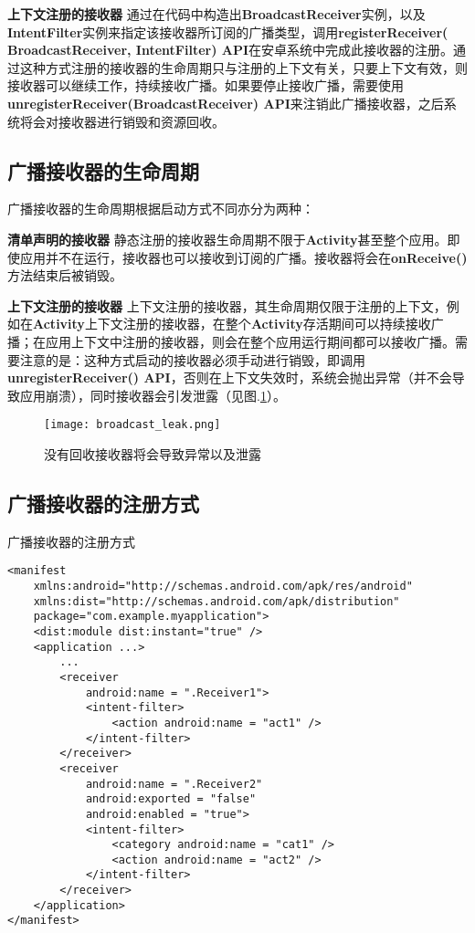 \textbf{上下文注册的接收器 }\label{declaration:receiver in context} 通过在代码中构造出\textbf{BroadcastReceiver}实例，以及\textbf{IntentFilter}实例来指定该接收器所订阅的广播类型，调用\textbf{registerReceiver(\\BroadcastReceiver, IntentFilter) API}在安卓系统中完成此接收器的注册。通过这种方式注册的接收器的生命周期只与注册的上下文有关，只要上下文有效，则接收器可以继续工作，持续接收广播。如果要停止接收广播，需要使用\textbf{unregisterReceiver(BroadcastReceiver) API}来注销此广播接收器，之后系统将会对接收器进行销毁和资源回收。

\subsection{广播接收器的生命周期}

广播接收器的生命周期根据启动方式不同亦分为两种\cite{broadcast}：

\textbf{清单声明的接收器 } 静态注册的接收器生命周期不限于\textbf{Activity}甚至整个应用。即使应用并不在运行，接收器也可以接收到订阅的广播。接收器将会在\textbf{onReceive()}方法结束后被销毁。


\textbf{上下文注册的接收器 } 上下文注册的接收器，其生命周期仅限于注册的上下文，例如在\textbf{Activity}上下文注册的接收器，在整个\textbf{Activity}存活期间可以持续接收广播；在应用上下文中注册的接收器，则会在整个应用运行期间都可以接收广播。需要注意的是：这种方式启动的接收器必须手动进行销毁，即调用\textbf{unregisterReceiver() API}，否则在上下文失效时，系统会抛出异常（并不会导致应用崩溃），同时接收器会引发泄露（见图.\textcolor{red}{\ref{fig:broadcast_leak}}）。

\begin{figure}[htbp]
	\centering
	\texttt{[image: broadcast\_leak.png]} %
	\caption{没有回收接收器将会导致异常以及泄露}
	\label{fig:broadcast_leak}
\end{figure}

\subsection{广播接收器的注册方式}
\begin{listing}[htbp]
	\centering
	\caption{广播接收器的注册方式}
	\begin{verbatim}
<manifest 
	xmlns:android="http://schemas.android.com/apk/res/android"
	xmlns:dist="http://schemas.android.com/apk/distribution"
	package="com.example.myapplication">
	<dist:module dist:instant="true" />
	<application ...>
		...
		<receiver
			android:name = ".Receiver1">
			<intent-filter>
				<action android:name = "act1" />
			</intent-filter>
		</receiver>
		<receiver
			android:name = ".Receiver2"
			android:exported = "false"
			android:enabled = "true">
			<intent-filter>
				<category android:name = "cat1" />
				<action android:name = "act2" />
			</intent-filter>
		</receiver>
	</application>
</manifest>
	\end{verbatim}
	\label{declaration:receiver}
\end{listing}

